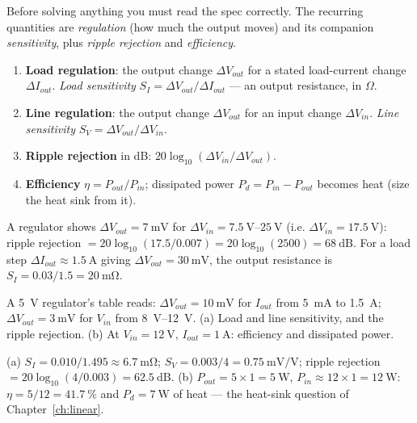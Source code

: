 \documentclass[11pt,a4paper,oneside]{book}
\begin{document}
Before solving anything you must read the spec correctly. The recurring
quantities are \emph{regulation} (how much the output moves) and its companion
\emph{sensitivity}, plus \emph{ripple rejection} and \emph{efficiency}.

\begin{protocol}
\begin{enumerate}[leftmargin=1.5cm]
  \item \textbf{Load regulation}: the output change $\Delta V_{out}$ for a stated
        load-current change $\Delta I_{out}$. \emph{Load sensitivity}
        $S_I=\Delta V_{out}/\Delta I_{out}$ --- an output resistance, in $\Omega$.
  \item \textbf{Line regulation}: the output change $\Delta V_{out}$ for an input
        change $\Delta V_{in}$. \emph{Line sensitivity}
        $S_V=\Delta V_{out}/\Delta V_{in}$.
  \item \textbf{Ripple rejection} in dB:
        $20\log_{10}(\Delta V_{in}/\Delta V_{out})$.
  \item \textbf{Efficiency} $\eta=P_{out}/P_{in}$; dissipated power
        $P_d=P_{in}-P_{out}$ becomes heat (size the heat sink from it).
\end{enumerate}
\end{protocol}

\begin{wexample}
A regulator shows $\Delta V_{out}=\qty{7}{\milli\volt}$ for
$\Delta V_{in}=\qtyrange{7.5}{25}{\volt}$ (i.e. $\Delta V_{in}=\qty{17.5}{\volt}$):
ripple rejection $=20\log_{10}(17.5/0.007)=20\log_{10}(2500)=\qty{68}{\dB}$. For a
load step $\Delta I_{out}\approx\qty{1.5}{\ampere}$ giving
$\Delta V_{out}=\qty{30}{\milli\volt}$, the output resistance is
$S_I=0.03/1.5=\qty{20}{\milli\ohm}$.
\end{wexample}

\begin{exercise}
A \qty{5}{\volt} regulator's table reads: $\Delta V_{out}=\qty{10}{\milli\volt}$
for $I_{out}$ from \qty{5}{\milli\ampere} to \qty{1.5}{\ampere};
$\Delta V_{out}=\qty{3}{\milli\volt}$ for $V_{in}$ from \qtyrange{8}{12}{\volt}.
(a) Load and line sensitivity, and the ripple rejection.
(b) At $V_{in}=\qty{12}{\volt}$, $I_{out}=\qty{1}{\ampere}$: efficiency and
dissipated power.
\end{exercise}
\begin{solution}
(a) $S_I=0.010/1.495\approx\qty{6.7}{\milli\ohm}$;
$S_V=0.003/4=\qty{0.75}{\milli\volt\per\volt}$; ripple rejection
$=20\log_{10}(4/0.003)=\qty{62.5}{\dB}$.
(b) $P_{out}=5\times1=\qty{5}{\watt}$, $P_{in}\approx12\times1=\qty{12}{\watt}$:
$\eta=5/12=\qty{41.7}{\percent}$ and $P_d=\qty{7}{\watt}$ of heat --- the
heat-sink question of Chapter~\ref{ch:linear}.
\end{solution}
\end{document}
